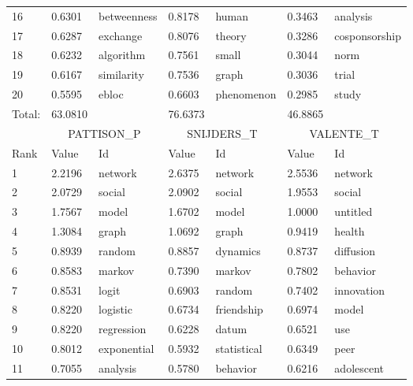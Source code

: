 \documentclass[11pt]{article} %
\begin{document}
\begin{center}
\begin{longtable}{p{0.7cm}|p{1.3cm}|p{2.6cm}||p{1.3cm}|p{2.6cm}||p{1.3cm}|p{2.6cm}}
        16 	&  0.6301  & betweenness    &	    0.8178  & human	       &	  0.3463 &  analysis	    \\
        17 	&  0.6287  & exchange	    &	    0.8076  & theory	       &	  0.3286 &  cosponsorship   \\
        18 	&  0.6232  & algorithm	    &	    0.7561  & small	       &	  0.3044 &  norm	    \\
        19 	&  0.6167  & similarity	    &	    0.7536  & graph	       &	  0.3036 &  trial	    \\
        20 	&  0.5595  & ebloc	    &	    0.6603  & phenomenon       &	  0.2985 &  study	    \\ \hline
     Total: & 63.0810	& 		  &   76.6373		& 		&  46.8865	  & 		    \\  \hline\hline
 & \multicolumn{2}{c}{PATTISON\_P} &  \multicolumn{2}{c}{SNIJDERS\_T}	  & 	 \multicolumn{2}{c}{VALENTE\_T} \\ \hline\hline
        Rank   &   Value  & Id		    & 	   Value  & Id		       &	 Value  & Id	    \\ \hline
           1   & 	2.2196  &  network	    & 	2.6375  &	 network	    &	    2.5536  &	 network	   \\
           2   & 	2.0729  &  social	    &	2.0902  &	 social		    &	    1.9553  &	 social	   \\
           3   & 	1.7567  &  model	    &	1.6702  &	 model		    &	    1.0000  &	 untitled	   \\
           4   & 	1.3084  &  graph	    &	1.0692  &	 graph		    &	    0.9419  &	 health	   \\
           5   & 	0.8939  &  random	    &	0.8857  &	 dynamics	    &	    0.8737  &	 diffusion	   \\
           6   & 	0.8583  &  markov	    &	0.7390  &	 markov		    &	    0.7802  &	 behavior	   \\
           7   & 	0.8531  &  logit	    &	0.6903  &	 random		    &	    0.7402  &	 innovation	   \\
           8   & 	0.8220  &  logistic	    &	0.6734  &	 friendship	    &	    0.6974  &	 model	   \\
           9   & 	0.8220  &  regression	    &	0.6228  &	 datum		    &	    0.6521  &	 use	   \\
          10   & 	0.8012  &  exponential	    &	0.5932  &	 statistical	    &	    0.6349  &	 peer	   \\
          11   & 	0.7055  &  analysis	    &	0.5780  &	 behavior	    &	    0.6216  &	 adolescent	   \\

\end{longtable}
\end{center}
\end{document}
